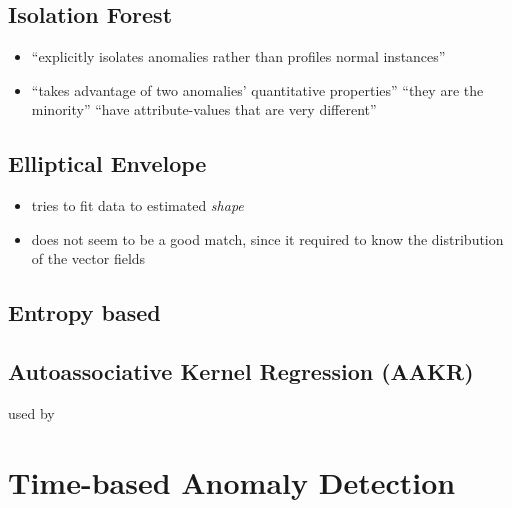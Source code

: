 \subsection{Isolation Forest}
\label{sec:background:network:novelty:isoforest}
	
	\begin{itemize}
		\item \enquote{explicitly isolates anomalies rather than profiles normal instances} \parencite{Liu2008}
		\item \enquote{takes advantage of two anomalies’ quantitative properties} \parencite{Liu2008}
			\subitem \enquote{they are the minority}
			\subitem \enquote{have attribute-values that are very different}
	\end{itemize}
	
\subsection{Elliptical Envelope}
\label{sec:background:network:novelty:envelope}
	
	\begin{itemize}
		\item tries to fit data to estimated \emph{shape}
		\item does not seem to be a good match, since it required to know the distribution of the vector fields
	\end{itemize}

	

	\subsection{Entropy based}
	\subsection{Autoassociative Kernel Regression (AAKR)}
		used by \textcite{Yang2006}

\section{Time-based Anomaly Detection}

